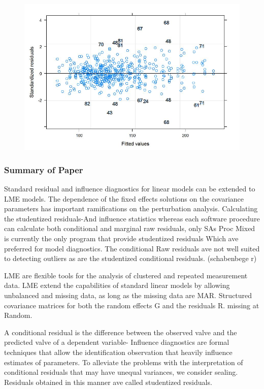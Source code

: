 \documentclass[12pt, a4paper]{report}
\theoremstyle{plain}
\theoremstyle{definition}
\theoremstyle{remark}
\begin{document}
	\begin{figure}[h!]
		\centering
		\includegraphics[width=0.9\linewidth]{images/Residuals-JS-roy}
		\caption{}
		\label{fig:Residuals-JS-ARoy2009}
	\end{figure}
	
	\subsubsection{Summary of Paper}
	Standard residual and influence diagnostics for linear models can be extended to LME models.
	The dependence of the fixed effects solutions on the covariance parameters has important ramifications on the perturbation analysis.	
	Calculating the studentized residuals-And influence statistics whereas each software procedure can calculate both conditional and marginal raw residuals, only SAs Proc Mixed is currently the only program that provide studentized residuals Which ave preferred for model diagnostics. The conditional Raw residuals ave not well suited to detecting outliers as are the studentized conditional residuals. (schabenbege r)
	
	
	LME are flexible tools for the analysis of clustered and repeated measurement data. LME extend the capabilities of standard linear models by allowing unbalanced and missing data, as long as the missing data are MAR. Structured covariance matrices for both the random effects G and the residuals R. missing at Random.
	
	A conditional residual is the difference between the observed valve and the predicted valve of a dependent variable- Influence diagnostics are formal techniques that allow the identification observation that heavily influence estimates of parameters.
	To alleviate the problems with the interpretation of conditional residuals that may have unequal variances, we consider sealing.
	Residuals obtained in this manner ave called studentized residuals.
	
\end{document}
